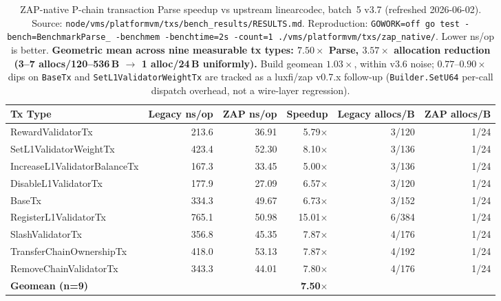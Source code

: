 \begin{table}[h]
\centering
\small
\caption{ZAP-native P-chain transaction Parse speedup vs upstream
linearcodec, batch~5 v3.7 (refreshed 2026-06-02). Source:
\texttt{node/vms/platformvm/txs/bench\_results/RESULTS.md}.
Reproduction: \texttt{GOWORK=off go test -bench=BenchmarkParse\_
-benchmem -benchtime=2s -count=1 ./vms/platformvm/txs/zap\_native/}.
Lower ns/op is better. \textbf{Geometric mean across nine measurable tx
types: $7.50\times$ Parse, $3.57\times$ allocation reduction
(3--7 allocs/120--536\,B $\to$ 1 alloc/24\,B uniformly).} Build geomean
$1.03\times$, within v3.6 noise; $0.77$--$0.90\times$ dips on
\texttt{BaseTx} and \texttt{SetL1ValidatorWeightTx} are tracked as a
luxfi/zap v0.7.x follow-up (\texttt{Builder.SetU64} per-call dispatch
overhead, not a wire-layer regression).}
\label{tab:zap-pchain}
\begin{tabular}{lrrrrr}
\toprule
\textbf{Tx Type} & \textbf{Legacy ns/op} & \textbf{ZAP ns/op}
  & \textbf{Speedup} & \textbf{Legacy allocs/B} & \textbf{ZAP allocs/B} \\
\midrule
RewardValidatorTx             & 213.6  & 36.91 & 5.79$\times$  & 3/120  & 1/24 \\
SetL1ValidatorWeightTx        & 423.4  & 52.30 & 8.10$\times$  & 3/136  & 1/24 \\
IncreaseL1ValidatorBalanceTx  & 167.3  & 33.45 & 5.00$\times$  & 3/136  & 1/24 \\
DisableL1ValidatorTx          & 177.9  & 27.09 & 6.57$\times$  & 3/120  & 1/24 \\
BaseTx                        & 334.3  & 49.67 & 6.73$\times$  & 3/152  & 1/24 \\
RegisterL1ValidatorTx         & 765.1  & 50.98 & 15.01$\times$ & 6/384  & 1/24 \\
SlashValidatorTx              & 356.8  & 45.35 & 7.87$\times$  & 4/176  & 1/24 \\
TransferChainOwnershipTx      & 418.0  & 53.13 & 7.87$\times$  & 4/192  & 1/24 \\
RemoveChainValidatorTx        & 343.3  & 44.01 & 7.80$\times$  & 4/176  & 1/24 \\
\midrule
\textbf{Geomean (n=9)}        &        &       & \textbf{7.50$\times$} &        & \\
\bottomrule
\end{tabular}
\end{table}

